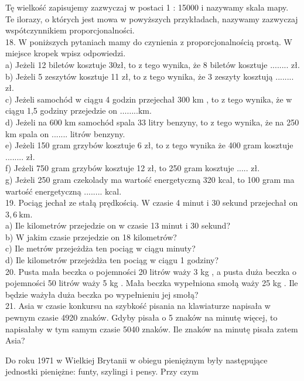 \documentclass[10pt]{article}
\begin{document}
Tę wielkość zapisujemy zazwyczaj w postaci 1 : 15000 i nazywamy skala mapy.\\
Te ilorazy, o których jest mowa w powyższych przykładach, nazywamy zazwyczaj wspótczynnikiem proporcjonalności.\\
18. W poniższych pytaniach mamy do czynienia z proporcjonalnością prostą. W miejsce kropek wpisz odpowiedzi.\\
a) Jeżeli 12 biletów kosztuje \(30 \mathrm{zł}\), to z tego wynika, że 8 biletów kosztuje ........ zł.\\
b) Jeżeli 5 zeszytów kosztuje 11 zł, to z tego wynika, że 3 zeszyty kosztują ........ zł.\\
c) Jeżeli samochód w ciągu 4 godzin przejechał 300 km , to z tego wynika, że w ciągu 1,5 godziny przejedzie on \(\ldots \ldots . . \mathrm{km}\).\\
d) Jeżeli na 600 km samochód spala 33 litry benzyny, to z tego wynika, że na 250 km spala on ....... litrów benzyny.\\
e) Jeżeli 150 gram grzybów kosztuje 6 zł, to z tego wynika że 400 gram kosztuje ........ zł.\\
f) Jeżeli 750 gram grzybów kosztuje 12 zł, to 250 gram kosztuje ..... zł.\\
g) Jeżeli 250 gram czekolady ma wartość energetyczną 320 kcal, to 100 gram ma wartość energetyczną ........ kcal.\\
19. Pociąg jechał ze stałą prędkością. W czasie 4 minut i 30 sekund przejechał on \(3,6 \mathrm{~km}\).\\
a) Ile kilometrów przejedzie on w czasie 13 minut i 30 sekund?\\
b) W jakim czasie przejedzie on 18 kilometrów?\\
c) Ile metrów przejeżdża ten pociąg w ciągu minuty?\\
d) Ile kilometrów przejeżdża ten pociąg w ciągu 1 godziny?\\
20. Pusta mała beczka o pojemności 20 litrów waży 3 kg , a pusta duża beczka o pojemności 50 litrów waży 5 kg . Mała beczka wypełniona smołą waży 25 kg . Ile będzie ważyła duża beczka po wypełnieniu jej smołą?\\
21. Asia w czasie konkursu na szybkość pisania na klawiaturze napisała w pewnym czasie 4920 znaków. Gdyby pisała o 5 znaków na minutę więcej, to napisałaby w tym samym czasie 5040 znaków. Ile znaków na minutę pisała zatem Asia?

Do roku 1971 w Wielkiej Brytanii w obiegu pieniężnym były następujące jednostki pieniężne: funty, szylingi i pensy. Przy czym
\end{document}
